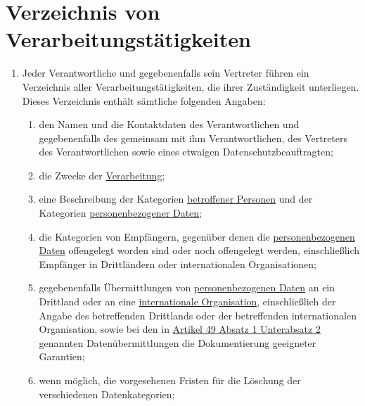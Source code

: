 \chapter{Verzeichnis von Verarbeitungstätigkeiten}
\label{ch:30}


\begin{enumerate}

  \item Jeder Verantwortliche und gegebenenfalls sein Vertreter führen ein Verzeichnis aller Verarbeitungstätigkeiten,
   die ihrer Zuständigkeit unterliegen. Dieses Verzeichnis enthält sämtliche folgenden Angaben:
  \label{itm:30-1}

  \begin{enumerate}
  
    \item den Namen und die Kontaktdaten des Verantwortlichen und gegebenenfalls des gemeinsam mit ihm Verantwortlichen,
     des Vertreters des Verantwortlichen sowie eines etwaigen Datenschutzbeauftragten;
    \label{itm:30-1a}

    \item die Zwecke der \hyperref[itm:04-2]{Verarbeitung};
    \label{itm:30-1b}

    \item eine Beschreibung der Kategorien \hyperref[itm:04-1]{betroffener Personen} und der Kategorien \hyperref[itm:04-1]{personenbezogener Daten};
    \label{itm:30-1c}

    \item die Kategorien von Empfängern, gegenüber denen die \hyperref[itm:04-1]{personenbezogenen Daten} offengelegt worden sind oder noch
     offengelegt werden, einschließlich Empfänger in Drittländern oder internationalen Organisationen;
    \label{itm:30-1d}

    \item gegebenenfalls Übermittlungen von \hyperref[itm:04-1]{personenbezogenen Daten} an ein Drittland oder an eine \hyperref[itm:04-29]{internationale
     Organisation}, einschließlich der Angabe des betreffenden Drittlands oder der betreffenden internationalen
     Organisation, sowie bei den in \hyperref[itm:49-1-2]{Artikel 49 Absatz 1 Unterabsatz 2} genannten
     Datenübermittlungen die Dokumentierung geeigneter Garantien;
    \label{itm:30-1e}

    \item wenn möglich, die vorgesehenen Fristen für die Löschung der verschiedenen Datenkategorien;
    \label{itm:30-1f}


\end{enumerate}
\end{enumerate}
